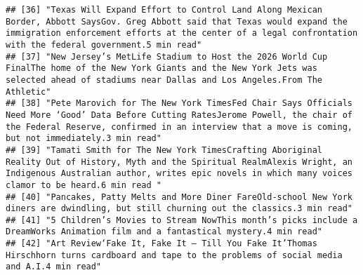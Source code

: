 \documentclass[
]{article}
\begin{document}
\begin{verbatim}
## [36] "Texas Will Expand Effort to Control Land Along Mexican Border, Abbott SaysGov. Greg Abbott said that Texas would expand the immigration enforcement efforts at the center of a legal confrontation with the federal government.5 min read"                                                                                                                                                                            
## [37] "New Jersey’s MetLife Stadium to Host the 2026 World Cup FinalThe home of the New York Giants and the New York Jets was selected ahead of stadiums near Dallas and Los Angeles.From The Athletic"                                                                                                                                                                                                                      
## [38] "Pete Marovich for The New York TimesFed Chair Says Officials Need More ‘Good’ Data Before Cutting RatesJerome Powell, the chair of the Federal Reserve, confirmed in an interview that a move is coming, but not immediately.3 min read"                                                                                                                                                                              
## [39] "Tamati Smith for The New York TimesCrafting Aboriginal Reality Out of History, Myth and the Spiritual RealmAlexis Wright, an Indigenous Australian author, writes epic novels in which many voices clamor to be heard.6 min read "                                                                                                                                                                                    
## [40] "Pancakes, Patty Melts and More Diner FareOld-school New York diners are dwindling, but still churning out the classics.3 min read"                                                                                                                                                                                                                                                                                    
## [41] "5 Children’s Movies to Stream NowThis month’s picks include a DreamWorks Animation film and a fantastical mystery.4 min read"                                                                                                                                                                                                                                                                                         
## [42] "Art Review‘Fake It, Fake It — Till You Fake It’Thomas Hirschhorn turns cardboard and tape to the problems of social media and A.I.4 min read"                                                                                                                                                                                                                                                                         

\end{verbatim}
\end{document}
